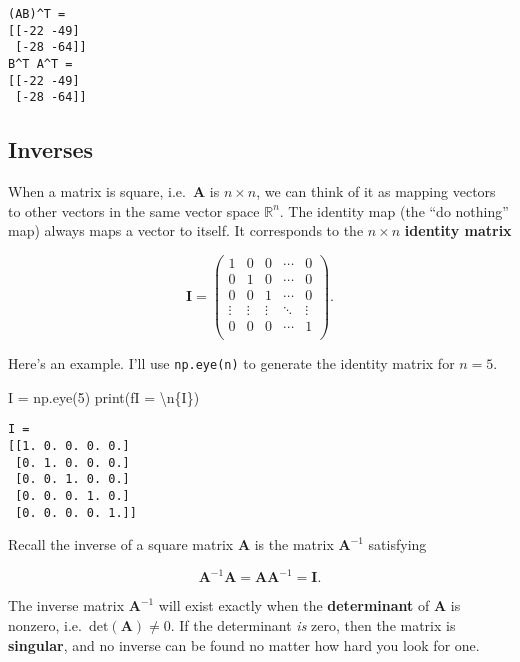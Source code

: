 \documentclass[
  letterpaper,
  DIV=11,
  numbers=noendperiod]{scrreprt}
\newenvironment{Shaded}{\begin{snugshade}}{\end{snugshade}}
\newcommand{\BuiltInTok}[1]{\textcolor[rgb]{0.00,0.23,0.31}{#1}}
\newcommand{\CharTok}[1]{\textcolor[rgb]{0.13,0.47,0.30}{#1}}
\newcommand{\DecValTok}[1]{\textcolor[rgb]{0.68,0.00,0.00}{#1}}
\newcommand{\NormalTok}[1]{\textcolor[rgb]{0.00,0.23,0.31}{#1}}
\newcommand{\OperatorTok}[1]{\textcolor[rgb]{0.37,0.37,0.37}{#1}}
\newcommand{\SpecialCharTok}[1]{\textcolor[rgb]{0.37,0.37,0.37}{#1}}
\newcommand{\SpecialStringTok}[1]{\textcolor[rgb]{0.13,0.47,0.30}{#1}}
\begin{document}
\begin{verbatim}
(AB)^T = 
[[-22 -49]
 [-28 -64]]
B^T A^T = 
[[-22 -49]
 [-28 -64]]
\end{verbatim}

\hypertarget{inverses}{%
\subsection{Inverses}\label{inverses}}

When a matrix is square, i.e.~\(\mathbf{A}\) is \(n \times n\), we can
think of it as mapping vectors to other vectors in the same vector space
\(\mathbb{R}^n\). The identity map (the ``do nothing'' map) always maps
a vector to itself. It corresponds to the \(n \times n\)
\textbf{identity matrix}

\[
\mathbf{I} = 
\begin{pmatrix}
1 & 0 & 0 & \cdots & 0 \\
0 & 1 & 0 & \cdots & 0 \\
0 & 0 & 1 & \cdots & 0 \\
\vdots & \vdots & \vdots & \ddots & \vdots \\
0 & 0 & 0 & \cdots & 1 \\
\end{pmatrix}.
\]

Here's an example. I'll use \texttt{np.eye(n)} to generate the identity
matrix for \(n=5\).

\begin{Shaded}
\begin{Highlighting}[]
\NormalTok{I }\OperatorTok{=}\NormalTok{ np.eye(}\DecValTok{5}\NormalTok{)}
\BuiltInTok{print}\NormalTok{(}\SpecialStringTok{f\textquotesingle{}I = }\CharTok{\textbackslash{}n}\SpecialCharTok{\{}\NormalTok{I}\SpecialCharTok{\}}\SpecialStringTok{\textquotesingle{}}\NormalTok{)}
\end{Highlighting}
\end{Shaded}

\begin{verbatim}
I = 
[[1. 0. 0. 0. 0.]
 [0. 1. 0. 0. 0.]
 [0. 0. 1. 0. 0.]
 [0. 0. 0. 1. 0.]
 [0. 0. 0. 0. 1.]]
\end{verbatim}

Recall the inverse of a square matrix \(\mathbf{A}\) is the matrix
\(\mathbf{A}^{-1}\) satisfying

\[\mathbf{A}^{-1}\mathbf{A} = \mathbf{A}\mathbf{A}^{-1} = \mathbf{I}.\]

The inverse matrix \(\mathbf{A}^{-1}\) will exist exactly when the
\textbf{determinant} of \(\mathbf{A}\) is nonzero,
i.e.~\(\text{det}(\mathbf{A}) \neq 0\). If the determinant \emph{is}
zero, then the matrix is \textbf{singular}, and no inverse can be found
no matter how hard you look for one.
\end{document}
